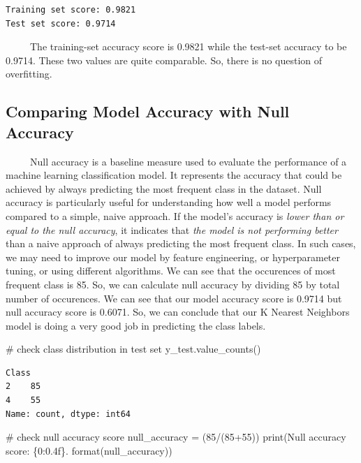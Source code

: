 \documentclass[
  letterpaper,
  DIV=11,
  numbers=noendperiod]{scrreprt}
\newenvironment{Shaded}{\begin{snugshade}}{\end{snugshade}}
\newcommand{\BuiltInTok}[1]{\textcolor[rgb]{0.00,0.23,0.31}{#1}}
\newcommand{\CommentTok}[1]{\textcolor[rgb]{0.37,0.37,0.37}{#1}}
\newcommand{\DecValTok}[1]{\textcolor[rgb]{0.68,0.00,0.00}{#1}}
\newcommand{\NormalTok}[1]{\textcolor[rgb]{0.00,0.23,0.31}{#1}}
\newcommand{\OperatorTok}[1]{\textcolor[rgb]{0.37,0.37,0.37}{#1}}
\newcommand{\SpecialCharTok}[1]{\textcolor[rgb]{0.37,0.37,0.37}{#1}}
\newcommand{\StringTok}[1]{\textcolor[rgb]{0.13,0.47,0.30}{#1}}
\begin{document}
\begin{verbatim}
Training set score: 0.9821
Test set score: 0.9714
\end{verbatim}

~~~~~The training-set accuracy score is 0.9821 while the test-set
accuracy to be 0.9714. These two values are quite comparable. So, there
is no question of overfitting.

\subsection{Comparing Model Accuracy with Null
Accuracy}\label{comparing-model-accuracy-with-null-accuracy}

~~~~~Null accuracy is a baseline measure used to evaluate the
performance of a machine learning classification model. It represents
the accuracy that could be achieved by always predicting the most
frequent class in the dataset. Null accuracy is particularly useful for
understanding how well a model performs compared to a simple, naive
approach. If the model's accuracy is \emph{lower than or equal to the
null accuracy}, it indicates that \emph{the model is not performing
better} than a naive approach of always predicting the most frequent
class. In such cases, we may need to improve our model by feature
engineering, or hyperparameter tuning, or using different algorithms. We
can see that the occurences of most frequent class is 85. So, we can
calculate null accuracy by dividing 85 by total number of occurences. We
can see that our model accuracy score is 0.9714 but null accuracy score
is 0.6071. So, we can conclude that our K Nearest Neighbors model is
doing a very good job in predicting the class labels.

\begin{Shaded}
\begin{Highlighting}[]
\CommentTok{\# check class distribution in test set}
\NormalTok{y\_test.value\_counts()}
\end{Highlighting}
\end{Shaded}

\begin{verbatim}
Class
2    85
4    55
Name: count, dtype: int64
\end{verbatim}

\begin{Shaded}
\begin{Highlighting}[]
\CommentTok{\# check null accuracy score}
\NormalTok{null\_accuracy }\OperatorTok{=}\NormalTok{ (}\DecValTok{85}\OperatorTok{/}\NormalTok{(}\DecValTok{85}\OperatorTok{+}\DecValTok{55}\NormalTok{))}
\BuiltInTok{print}\NormalTok{(}\StringTok{\textquotesingle{}Null accuracy score: }\SpecialCharTok{\{0:0.4f\}}\StringTok{\textquotesingle{}}\NormalTok{. }\BuiltInTok{format}\NormalTok{(null\_accuracy))}
\end{Highlighting}
\end{Shaded}
\end{document}
